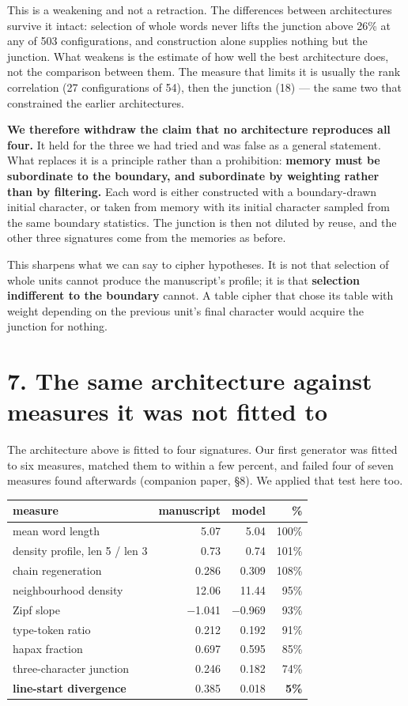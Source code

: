 \documentclass[11pt,a4paper]{article}
\begin{document}
This is a weakening and not a retraction. The differences between architectures survive it intact: selection of whole words never lifts the junction above 26\% at any of 503 configurations, and construction alone supplies nothing but the junction. What weakens is the estimate of how well the best architecture does, not the comparison between them. The measure that limits it is usually the rank correlation (27 configurations of 54), then the junction (18) --- the same two that constrained the earlier architectures.


\textbf{We therefore withdraw the claim that no architecture reproduces all four.} It held for the three we had tried and was false as a general statement. What replaces it is a principle rather than a prohibition: \textbf{memory must be subordinate to the boundary, and subordinate by weighting rather than by filtering.} Each word is either constructed with a boundary-drawn initial character, or taken from memory with its initial character sampled from the same boundary statistics. The junction is then not diluted by reuse, and the other three signatures come from the memories as before.


This sharpens what we can say to cipher hypotheses. It is not that selection of whole units cannot produce the manuscript's profile; it is that \textbf{selection indifferent to the boundary} cannot. A table cipher that chose its table with weight depending on the previous unit's final character would acquire the junction for nothing.


\section*{7. The same architecture against measures it was not fitted to}


The architecture above is fitted to four signatures. Our first generator was fitted to six measures, matched them to within a few percent, and failed four of seven measures found afterwards (companion paper, \S8). We applied that test here too.


\begin{table}[htbp]\centering\small
\begin{tabular}{@{}lrrr@{}}
\toprule
measure & manuscript & model & \% \\
\midrule
mean word length & 5.07 & 5.04 & 100\% \\
density profile, len 5 / len 3 & 0.73 & 0.74 & 101\% \\
chain regeneration & 0.286 & 0.309 & 108\% \\
neighbourhood density & 12.06 & 11.44 & 95\% \\
Zipf slope & $-$1.041 & $-$0.969 & 93\% \\
type-token ratio & 0.212 & 0.192 & 91\% \\
hapax fraction & 0.697 & 0.595 & 85\% \\
three-character junction & 0.246 & 0.182 & 74\% \\
\textbf{line-start divergence} & 0.385 & 0.018 & \textbf{5\%} \\
\bottomrule
\end{tabular}
\end{table}
\end{document}
